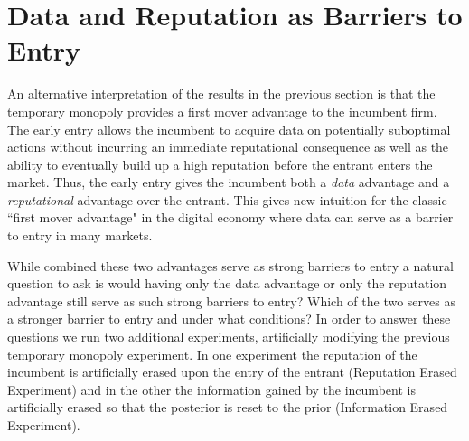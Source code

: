 \documentclass[../competing_bandits.tex]{subfiles}
\begin{document}
\section{Data and Reputation as Barriers to Entry}\label{section:6}

An alternative interpretation of the results in the previous section is that the temporary monopoly provides a first mover advantage to the incumbent firm. The early entry allows the incumbent to acquire data on potentially suboptimal actions without incurring an immediate reputational consequence as well as the ability to eventually build up a high reputation before the entrant enters the market. Thus, the early entry gives the incumbent both a \textit{data} advantage and a \textit{reputational} advantage over the entrant. This gives new intuition for the classic ``first mover advantage" \cite{kerin1992first} in the digital economy where data can serve as a barrier to entry in many markets.

While combined these two advantages serve as strong barriers to entry a natural question to ask is would having only the data advantage or only the reputation advantage still serve as such strong barriers to entry? Which of the two serves as a stronger barrier to entry and under what conditions? In order to answer these questions we run two additional experiments, artificially modifying the previous temporary monopoly experiment. In one experiment the reputation of the incumbent is artificially erased upon the entry of the entrant (Reputation Erased Experiment) and in the other the information gained by the incumbent is artificially erased so that the posterior is reset to the prior (Information Erased Experiment).
\end{document}
